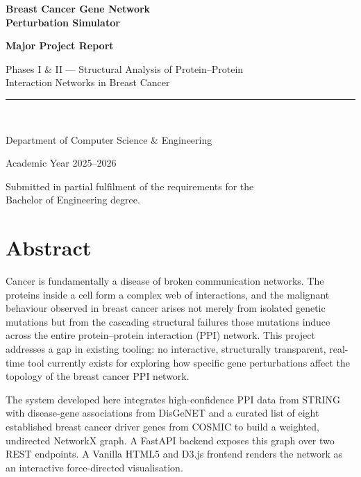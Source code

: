 \documentclass[12pt,a4paper]{report}
\begin{document}
\begin{titlepage}
  \centering
  \vspace*{2cm}
  {\huge\bfseries\color{primaryblue}
    Breast Cancer Gene Network\\[0.4em]
    Perturbation Simulator\par}
  \vspace{1.5cm}
  {\Large\bfseries Major Project Report\par}
  \vspace{0.5cm}
  {\large Phases I \& II — Structural Analysis of Protein–Protein\\
  Interaction Networks in Breast Cancer\par}
  \vspace{2cm}
  \rule{0.6\textwidth}{0.5pt}\\[1em]
  {\large Department of Computer Science \& Engineering\par}
  \vspace{0.4cm}
  {\large Academic Year 2025--2026\par}
  \vspace{3cm}
  \vfill
  {\small Submitted in partial fulfilment of the requirements for the\\
  Bachelor of Engineering degree.\par}
\end{titlepage}

\chapter*{Abstract}

Cancer is fundamentally a disease of broken communication networks. The proteins inside a cell form a complex web of interactions, and the malignant behaviour observed in breast cancer arises not merely from isolated genetic mutations but from the cascading structural failures those mutations induce across the entire protein–protein interaction (PPI) network. This project addresses a gap in existing tooling: no interactive, structurally transparent, real-time tool currently exists for exploring how specific gene perturbations affect the topology of the breast cancer PPI network.

The system developed here integrates high-confidence PPI data from STRING \citep{szklarczyk2023string} with disease-gene associations from DisGeNET \citep{pinero2020disgenet} and a curated list of eight established breast cancer driver genes from COSMIC to build a weighted, undirected NetworkX graph. A FastAPI backend exposes this graph over two REST endpoints. A Vanilla HTML5 and D3.js frontend renders the network as an interactive force-directed visualisation.
\end{document}
